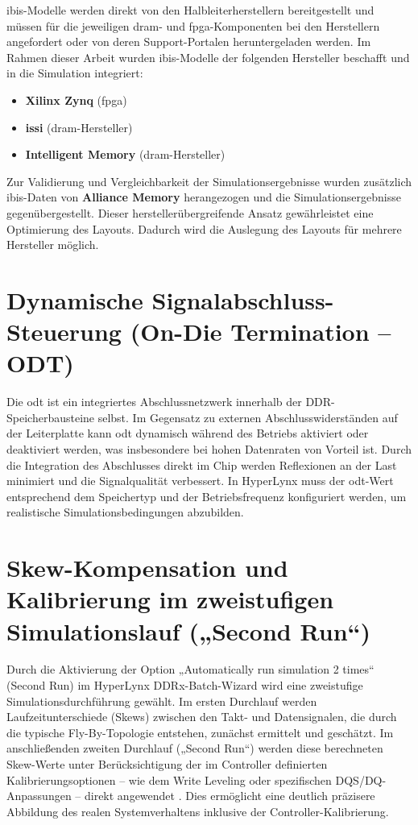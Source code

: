 \gls{ibis}-Modelle werden direkt von den Halbleiterherstellern bereitgestellt und müssen für die jeweiligen \gls{dram}- und \gls{fpga}-Komponenten bei den Herstellern angefordert oder von deren Support-Portalen heruntergeladen werden. Im Rahmen dieser Arbeit wurden \gls{ibis}-Modelle der folgenden Hersteller beschafft und in die Simulation integriert:
\begin{itemize}
    \item \textbf{Xilinx Zynq} (\gls{fpga})
    \item \textbf{\gls{issi}} (\gls{dram}-Hersteller)
    \item \textbf{Intelligent Memory} (\gls{dram}-Hersteller)
\end{itemize}

Zur Validierung und Vergleichbarkeit der Simulationsergebnisse wurden zusätzlich \gls{ibis}-Daten von \textbf{Alliance Memory} herangezogen und die Simulationsergebnisse gegenübergestellt. Dieser herstellerübergreifende Ansatz gewährleistet eine Optimierung des Layouts. Dadurch wird die Auslegung des Layouts für mehrere Hersteller möglich.

\section{Dynamische Signalabschluss-Steuerung (On-Die Termination – ODT)}
Die \gls{odt} ist ein integriertes Abschlussnetzwerk innerhalb der DDR-Speicherbausteine selbst. Im Gegensatz zu externen Abschlusswiderständen auf der Leiterplatte kann \gls{odt} dynamisch während des Betriebs aktiviert oder deaktiviert werden, was insbesondere bei hohen Datenraten von Vorteil ist. Durch die Integration des Abschlusses direkt im Chip werden Reflexionen an der Last minimiert und die Signalqualität verbessert. In HyperLynx muss der \gls{odt}-Wert entsprechend dem Speichertyp und der Betriebsfrequenz konfiguriert werden, um realistische Simulationsbedingungen abzubilden.

\section{Skew-Kompensation und Kalibrierung im zweistufigen Simulationslauf („Second Run“)}
Durch die Aktivierung der Option „Automatically run simulation 2 times“ (Second Run) im HyperLynx DDRx-Batch-Wizard wird eine zweistufige Simulationsdurchführung gewählt. Im ersten Durchlauf werden Laufzeitunterschiede (Skews) zwischen den Takt- und Datensignalen, die durch die typische Fly-By-Topologie entstehen, zunächst ermittelt und geschätzt. Im anschließenden zweiten Durchlauf („Second Run“) werden diese berechneten Skew-Werte unter Berücksichtigung der im Controller definierten Kalibrierungsoptionen – wie dem Write Leveling oder spezifischen DQS/DQ-Anpassungen – direkt angewendet \cite{xilinx_ultrascale_sim}. Dies ermöglicht eine deutlich präzisere Abbildung des realen Systemverhaltens inklusive der Controller-Kalibrierung.

